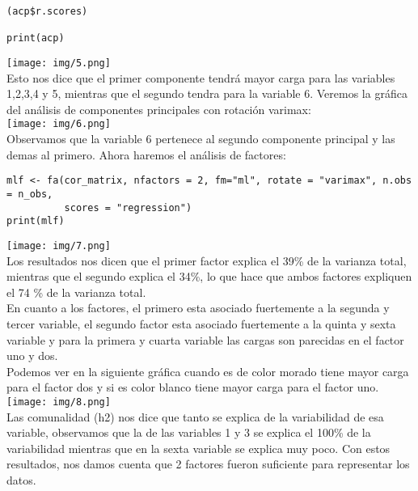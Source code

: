 \begin{sol}
\begin{verbatim}
(acp$r.scores)

print(acp)
\end{verbatim}
\texttt{[image: img/5.png]}\\
Esto nos dice que el primer componente tendrá mayor carga para las variables 1,2,3,4 y 5, mientras que el segundo tendra para la variable 6. Veremos la gráfica del análisis de componentes principales con rotación varimax:\\
\texttt{[image: img/6.png]}\\
Observamos que la variable 6 pertenece al segundo componente principal y las demas al primero. Ahora haremos el análisis de factores:
\begin{verbatim}
mlf <- fa(cor_matrix, nfactors = 2, fm="ml", rotate = "varimax", n.obs = n_obs,
          scores = "regression")
print(mlf)
\end{verbatim}
\texttt{[image: img/7.png]}\\
Los resultados nos dicen que el primer factor explica el 39\% de la varianza total, mientras que el segundo explica el 34\%, lo que hace que ambos factores expliquen el 74 \% de la varianza total.\\ En cuanto a los factores, el primero esta asociado fuertemente a la segunda y tercer variable, el segundo factor esta asociado fuertemente a la quinta y sexta variable y para la primera y cuarta variable las cargas son parecidas en el factor uno y dos. \\ 
Podemos ver en la siguiente gráfica cuando es de color morado tiene mayor carga para el factor dos y si es color blanco tiene mayor carga para el factor uno.\\
\texttt{[image: img/8.png]}\\
Las comunalidad (h2) nos dice que tanto se explica de la variabilidad de esa variable, observamos que la de las variables 1 y 3 se explica el 100\% de la variabilidad mientras que en la sexta variable se explica muy poco.
Con estos resultados, nos damos cuenta que 2 factores fueron suficiente para representar los datos.  
\end{sol}
